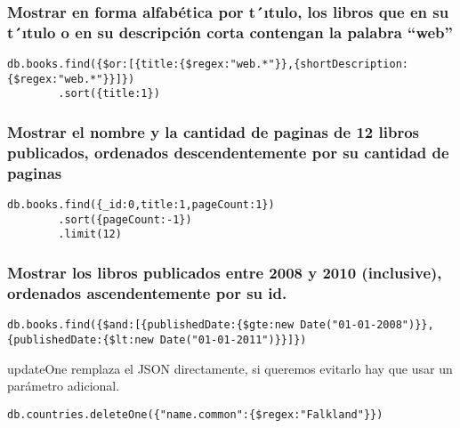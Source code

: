 \subsubsection*{Mostrar en forma alfabética por t´ıtulo, los libros que en su t´ıtulo o en su descripción corta contengan la palabra “web”}

\begin{verbatim}
db.books.find({$or:[{title:{$regex:"web.*"}},{shortDescription:{$regex:"web.*"}}]})
        .sort({title:1})    

\end{verbatim}

\subsubsection*{Mostrar el nombre y la cantidad de paginas de 12 libros publicados, ordenados descendentemente por su cantidad de paginas}

\begin{verbatim}
db.books.find({_id:0,title:1,pageCount:1})
        .sort({pageCount:-1})
        .limit(12)
\end{verbatim}

\subsubsection*{Mostrar los libros publicados entre 2008 y 2010 (inclusive), ordenados ascendentemente por su id.}

\begin{verbatim}
db.books.find({$and:[{publishedDate:{$gte:new Date("01-01-2008")}},{publishedDate:{$lt:new Date("01-01-2011")}}]})

\end{verbatim}







\noindent updateOne remplaza el JSON directamente, si queremos evitarlo hay que usar un parámetro adicional.

\begin{verbatim}
db.countries.deleteOne({"name.common":{$regex:"Falkland"}})
\end{verbatim}

\newpage
